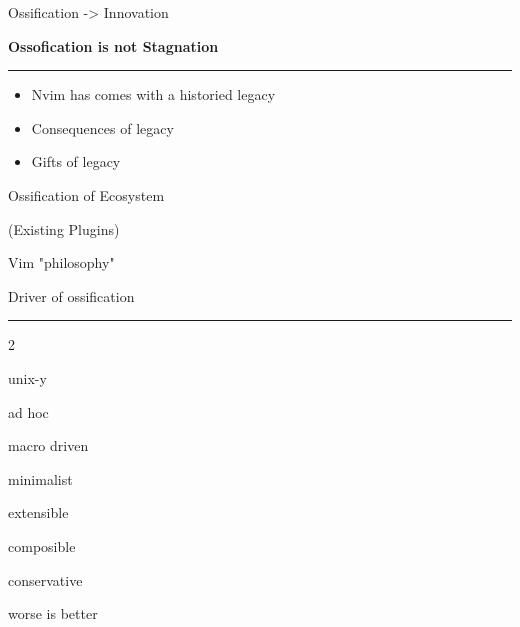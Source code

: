 \documentclass{beamer}
\begin{document}
\begin{frame}{Ossification -> Innovation}

	\textbf{Ossofication is not Stagnation}

	\rule{\textwidth}{0.1em}

	\begin{itemize}

		\item Nvim has comes with a historied legacy

		\item Consequences of legacy

		\item Gifts of legacy

	\end{itemize}

\end{frame}


\begin{frame}[standout]

	Ossification of Ecosystem

	(Existing Plugins)

\end{frame}


\begin{frame}{Vim "philosophy"}

	Driver of ossification

	\rule{\textwidth}{0.1em}

	\begin{itemize}


	\end{itemize}

\end{frame}
\end{document}
